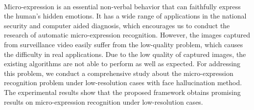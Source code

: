 \\
Micro-expression is an essential non-verbal behavior that can faithfully express the human's hidden emotions. It has a wide range of applications in the national security and computer aided diagnosis, which encourages us to conduct the research of automatic micro-expression recognition. However, the images captured from surveillance video easily suffer from the low-quality problem, which causes the difficulty in real applications. Due to the low quality of captured images, the existing algorithms are not able to perform as well as expected. For addressing this problem, we conduct a comprehensive study about the micro-expression recognition problem under low-resolution cases with face hallucination method. The experimental results show that the proposed framework obtains promising results on micro-expression recognition under low-resolution cases.

